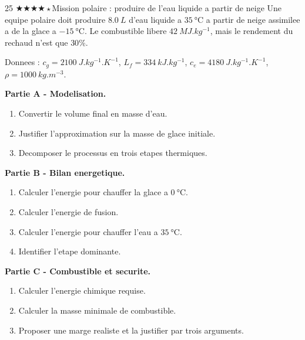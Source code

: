\documentclass[11pt,a4paper]{article}
\newcommand{\difffour}{\(\bigstar\bigstar\bigstar\bigstar\star\)}
\begin{document}
\begin{probleme}{25 \difffour}{Mission polaire : produire de l'eau liquide a partir de neige}
Une equipe polaire doit produire \(\SI{8.0}{L}\) d'eau liquide a \(\SI{35}{\celsius}\) a partir de neige assimilee a de la glace a \(\SI{-15}{\celsius}\). Le combustible libere \(\SI{42}{MJ.kg^{-1}}\), mais le rendement du rechaud n'est que \(30\%\).

Donnees : \(c_g=\SI{2100}{J.kg^{-1}.K^{-1}}\), \(L_f=\SI{334}{kJ.kg^{-1}}\), \(c_e=\SI{4180}{J.kg^{-1}.K^{-1}}\), \(\rho=\SI{1000}{kg.m^{-3}}\).

\textbf{Partie A - Modelisation.}
\begin{enumerate}
\item Convertir le volume final en masse d'eau.
\item Justifier l'approximation sur la masse de glace initiale.
\item Decomposer le processus en trois etapes thermiques.
\end{enumerate}

\textbf{Partie B - Bilan energetique.}
\begin{enumerate}[resume]
\item Calculer l'energie pour chauffer la glace a \(\SI{0}{\celsius}\).
\item Calculer l'energie de fusion.
\item Calculer l'energie pour chauffer l'eau a \(\SI{35}{\celsius}\).
\item Identifier l'etape dominante.
\end{enumerate}

\textbf{Partie C - Combustible et securite.}
\begin{enumerate}[resume]
\item Calculer l'energie chimique requise.
\item Calculer la masse minimale de combustible.
\item Proposer une marge realiste et la justifier par trois arguments.
\end{enumerate}
\end{probleme}
\end{document}

